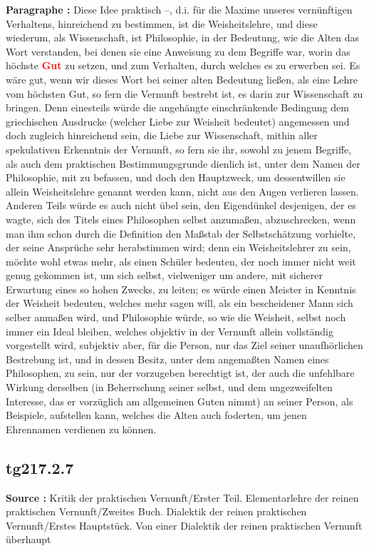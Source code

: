\documentclass[a4paper,12pt,twoside]{book}
\newcommand{\match}[1]{\textcolor{red}{\textbf{#1}}}
\begin{document}
	\textbf{Paragraphe : }Diese Idee praktisch –, d.i. für die Maxime unseres vernünftigen Verhaltens, hinreichend zu bestimmen, ist die 
	Weisheitslehre, und diese wiederum, als Wissenschaft, ist Philosophie, in der Bedeutung, wie die Alten das Wort verstanden, bei denen sie eine Anweisung zu dem Begriffe war, worin das höchste \match{Gut} zu setzen, und zum Verhalten, durch welches es zu erwerben sei. Es wäre gut, wenn wir dieses Wort bei seiner alten Bedeutung ließen, als eine Lehre vom höchsten Gut, so fern die Vernunft bestrebt ist, es darin zur Wissenschaft zu bringen. Denn einesteils würde die angehängte einschränkende Bedingung dem griechischen Ausdrucke (welcher Liebe zur Weisheit bedeutet) angemessen und doch zugleich hinreichend sein, die Liebe zur Wissenschaft, mithin aller spekulativen Erkenntnis der Vernunft, so fern sie ihr, sowohl zu jenem Begriffe, als auch dem praktischen Bestimmungsgrunde dienlich ist, unter dem Namen der Philosophie, mit zu befassen, und doch den Hauptzweck, um dessentwillen sie allein Weisheitslehre genannt werden kann, nicht aus den Augen verlieren lassen. Anderen Teils würde es auch nicht übel sein, den Eigendünkel desjenigen, der es wagte, sich des Titels eines Philosophen selbst anzumaßen, abzuschrecken, wenn man ihm schon durch die Definition den Maßstab der Selbstschätzung vorhielte, der seine Ansprüche sehr herabstimmen wird; denn ein Weisheitslehrer zu sein, möchte wohl etwas mehr, als einen Schüler bedeuten, der noch immer nicht weit genug gekommen ist, um sich selbst, vielweniger um andere, mit sicherer Erwartung eines so hohen Zwecks, zu leiten; es würde einen Meister in Kenntnis der Weisheit bedeuten, welches mehr sagen will, als ein bescheidener Mann sich selber anmaßen wird, und Philosophie würde, so wie die Weisheit, selbst noch immer ein Ideal bleiben, welches objektiv in der Vernunft allein vollständig vorgestellt wird, subjektiv aber, für die Person, nur das Ziel seiner unaufhörlichen Bestrebung ist, und in dessen Besitz, unter dem angemaßten Namen eines Philosophen, zu sein, nur der vorzugeben berechtigt ist, der auch die unfehlbare Wirkung derselben (in Beherrschung seiner selbst, und dem ungezweifelten Interesse, das er vorzüglich am allgemeinen Guten nimmt) an seiner Person, als Beispiele, aufstellen kann, welches die Alten auch foderten, um jenen Ehrennamen verdienen zu können. 
	
	\subsection*{tg217.2.7} 
	\textbf{Source : }Kritik der praktischen Vernunft/Erster Teil. Elementarlehre der reinen praktischen Vernunft/Zweites Buch. Dialektik der reinen praktischen Vernunft/Erstes Hauptstück. Von einer Dialektik der reinen praktischen Vernunft überhaupt\\  
	
\end{document}
